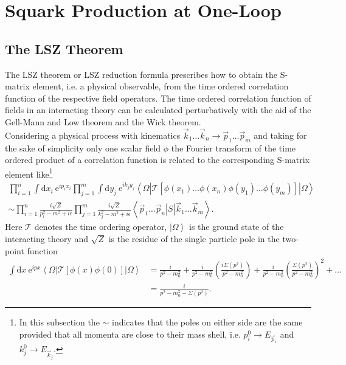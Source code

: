 \section{Squark Production at One-Loop}


\subsection{The LSZ Theorem}\label{sec:LSZ}
The LSZ theorem\cite{Lehmann:1954rq} or LSZ reduction formula prescribes how to obtain the S-matrix element, i.e. a physical observable, from the time ordered correlation function of the respective field operators. The time ordered correlation function of fields in an interacting theory can be calculated perturbatively with the aid of the Gell-Mann and Low theorem and the Wick theorem. \\
Considering a physical process with kinematics $\vec{k}_1 \hdots \vec{k}_n \to \vec{p}_1 \hdots \vec{p}_m$ and taking for the sake of simplicity only one scalar field $\phi$ the Fourier transform of the time ordered product of a correlation function is related to the corresponding S-matrix element like\footnote{In this subsection the $\sim$ indicates that the poles on either side are the same provided that all momenta are close to their mass shell, i.e. $p_i^0 \to E_{\vec{p}_i}$ and $k_j^0 \to E_{\vec{k}_j}$.}
\begin{align}
\prod_{i=1}^n \int \mathrm{d}x_i\ \mathrm{e}^{ip_i x_i} \prod_{j=1}^m \int \mathrm{d}y_j\ \mathrm{e}^{ik_j y_j} \left\langle \Omega | \mathcal{T} \left[ \phi(x_1) \hdots \phi(x_n) \phi(y_1) \hdots \phi(y_m) \right] | \Omega\right\rangle \nonumber\\
\sim \prod_{i=1}^n \frac{i\sqrt{Z}}{p_i^2 - m^2 + i\epsilon} \prod_{j=1}^m \frac{i\sqrt{Z}}{k_j^2 - m^2 + i\epsilon} \left\langle \left.\left.\vec{p}_1 \hdots \vec{p}_n \right| S \right| \vec{k}_1 \hdots \vec{k}_m \right\rangle .\label{eq:LSZ}
\end{align}
Here $\mathcal{T}$ denotes the time ordering operator, $\left.| \Omega \right\rangle$ is the ground state of the interacting theory and $\sqrt{Z}$ is the residue of the single particle pole in the two-point function 
\begin{align}
\int \mathrm{d}x\ \mathrm{e}^{ip x} \left\langle \Omega | \mathcal{T} \left[ \phi(x) \phi(0) \right] | \Omega\right\rangle &= \frac{i}{p^2-m_0^2} + \frac{i}{p^2-m_0^2} \left(\frac{i\Sigma(p^2)}{p^2-m_0^2}\right) + \frac{i}{p^2-m_0^2} \left(\frac{\Sigma(p^2)}{p^2-m_0^2}\right)^2 + \hdots\nonumber\\
&= \frac{i}{p^2 - m_0^2 - \Sigma(p^2)}.\label{eq:propagator}
\end{align}
